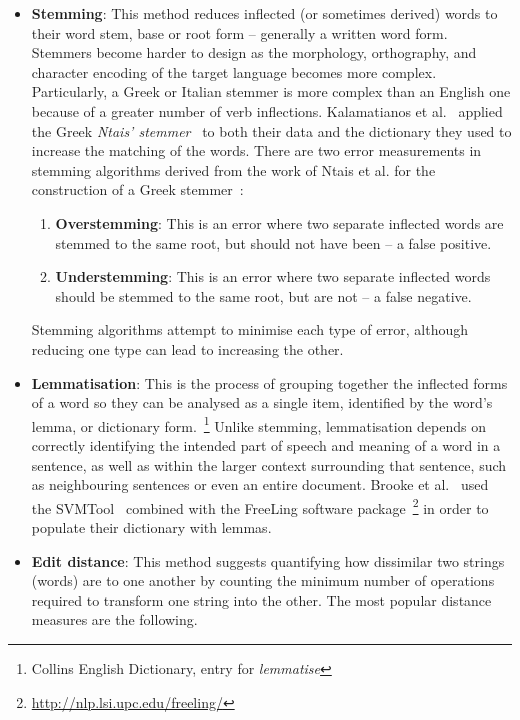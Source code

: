 \begin{itemize}
 \item \textbf{Stemming}: This method reduces inflected (or sometimes derived) words
 to their word stem, base or root form -- generally a written word form.
 Stemmers become harder to design as the morphology, orthography, and character encoding of the target language becomes more complex.
 Particularly, a Greek or Italian stemmer is more complex than an English one
 because of a greater number of verb inflections.
 Kalamatianos et al.~\cite{KMSA15} applied the Greek \emph{Ntais' stemmer}~\cite{Nta06}
 to both their data and the dictionary they used
 to increase the matching of the words.
 There are two error measurements in stemming algorithms
 derived from the work of Ntais et al.
 for the construction of a Greek stemmer~\cite{NSBD16}:

 \begin{enumerate}
  \item \textbf{Overstemming}: This is an error where two separate inflected words
  are stemmed to the same root, but should not have been -- a false positive.
  \item \textbf{Understemming}: This is an error where two separate inflected words
  should be stemmed to the same root, but are not -- a false negative.
 \end{enumerate}

 Stemming algorithms attempt to minimise each type of error,
 although reducing one type can lead to increasing the other.
 
 \item \textbf{Lemmatisation}:
 This is the process of grouping together the inflected forms of a word
 so they can be analysed as a single item,
 identified by the word's lemma, or dictionary form.~\footnote{Collins English Dictionary, entry for \emph{lemmatise}}
 Unlike stemming, lemmatisation depends on correctly identifying the intended part
 of speech and meaning of a word in a sentence,
 as well as within the larger context surrounding that sentence,
 such as neighbouring sentences or even an entire document.
 Brooke et al.~\cite{BTT09} used the SVMTool~\cite{GM04}
 combined with the FreeLing software package~\footnote {\url {http://nlp.lsi.upc.edu/freeling/}}
 in order to populate their dictionary with lemmas.

 \item \textbf{Edit distance}: This method suggests quantifying
 how dissimilar two strings (words) are to one another
 by counting the minimum number of operations required
 to transform one string into the other.
 The most popular distance measures are the following.
 

\end{itemize}
